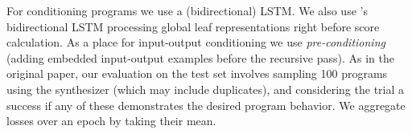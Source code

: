 \documentclass{article} %
\begin{document}
For conditioning programs we use a (bidirectional) LSTM.
We also use \citet{nsps}'s bidirectional LSTM processing global leaf representations right before score calculation.
%
As a place for input-output conditioning we use \emph{pre-conditioning}
(adding embedded input-output examples before the recursive pass).
%
%
As in the original paper,
our evaluation on the test set involves sampling 100 programs using the synthesizer (which may include duplicates),
and considering the trial a success if any of these demonstrates the desired program behavior.
%
%
We aggregate losses over an epoch by taking their mean.
\end{document}
